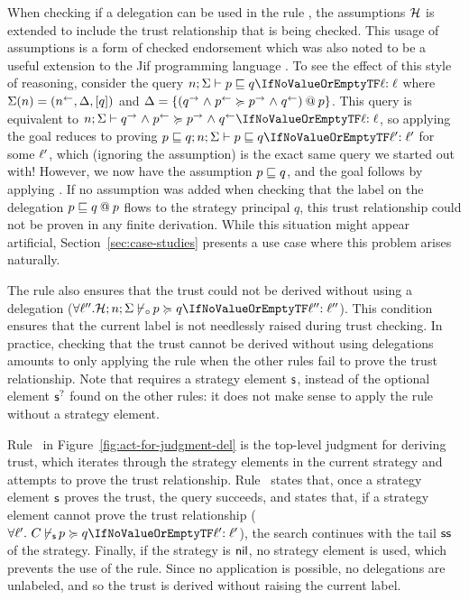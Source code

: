 When checking if a delegation can be used in the rule , the assumptions $\Assumps$ is extended to include the trust relationship that is being checked. This usage of assumptions is a form of checked endorsement which was also noted to be a useful extension to the Jif programming language \cite{Chong:2007:SWA:1294261.1294265}.
To see the effect of this style of reasoning, consider the query $\flowstoquery{n; \env}{p}{q}{\level}$ where $\env(n) = (\integ{n}, \scope, \lbrack q \rbrack)$ and $\scope = \{\lb{p}{(\conf{q} \conj \integ{p} \actsfor \conf{p} \conj \integ{q})} \}$. This query is equivalent to $\actsforquery{n; \env}{\conf{q} \conj \integ{p}}{\conf{p} \conj \integ{q}}{\level}$, so applying  the goal reduces to proving $\flowstoquery{p \flowsto q; n; \env}{p}{q}{\level'}$ for some $\level'$, which (ignoring the assumption) is the exact same query we started out with! However, we now have the assumption $p \flowsto q$, and the goal follows by applying . If no assumption was added when checking that the label on the delegation $\lb{p}{p \flowsto q}$ flows to the strategy principal $q$, this trust relationship could not be proven in any finite derivation. While this situation might appear artificial, Section~\ref{sec:case-studies} presents a use case where this problem arises naturally.

The rule also ensures that the trust could not be derived without using a delegation ($\forall \level''. \notactsforquery{\Assumps; n; \env}[\!\!\none]{\,p}{q}{\level''}$). This condition ensures that the current label is not needlessly raised during trust checking. In practice, checking that the trust cannot be derived without using delegations amounts to only applying the  rule when the other rules fail to prove the trust relationship. Note that  requires a strategy element $\stratelem$, instead of the optional element $\option{\stratelem}$ found on the other rules: it does not make sense to apply the  rule without a strategy element.

Rule~ in Figure~\ref{fig:act-for-judgment-del} is the top-level judgment for deriving trust, which iterates through the strategy elements in the current strategy and attempts to prove the trust relationship. Rule~ states that, once a strategy element $\stratelem$ proves the trust, the query succeeds, and  states that, if a strategy element cannot prove the trust relationship ($\forall \level'.~ \notactsforquery{C}[\!\!\stratelem]{\,p}{q}{\level'}$), the search continues with the tail $\stratelem*$ of the strategy. Finally, if the strategy is $\nil$, no strategy element is used, which prevents the use of the  rule. Since no application  is possible, no delegations are unlabeled, and so the trust is derived without raising the current label.

